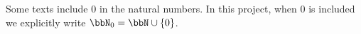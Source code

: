 \begin{remark} \label{remark:natural_numbers_zero_inclusive}
Some texts include $0$ in the natural numbers. In this project, when $0$ is included we explicitly write $\bbN_0 = \bbN \cup \{0\}$.
\end{remark}